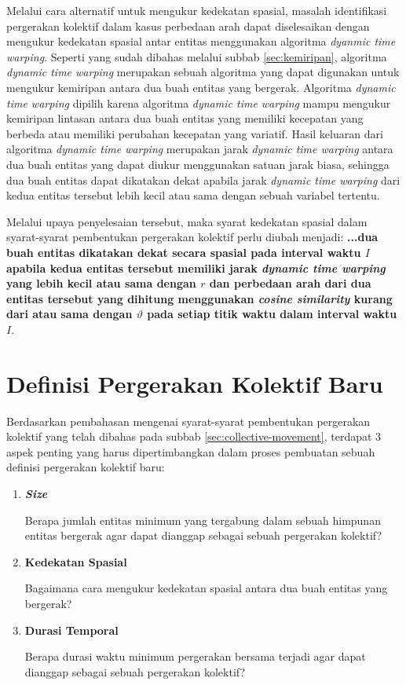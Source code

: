 Melalui cara alternatif untuk mengukur kedekatan spasial, masalah identifikasi pergerakan kolektif dalam kasus perbedaan arah dapat diselesaikan dengan mengukur kedekatan spasial antar entitas menggunakan algoritma \textit{dyanmic time warping}. Seperti yang sudah dibahas melalui subbab \ref{sec:kemiripan}, algoritma \textit{dynamic time warping} merupakan sebuah algoritma yang dapat digunakan untuk mengukur kemiripan antara dua buah entitas yang bergerak. Algoritma \textit{dynamic time warping} dipilih karena algoritma \textit{dynamic time warping} mampu mengukur kemiripan lintasan antara dua buah entitas yang memiliki kecepatan yang berbeda atau memiliki perubahan kecepatan yang variatif. Hasil keluaran dari algoritma \textit{dynamic time warping} merupakan jarak \textit{dynamic time warping} antara dua buah entitas yang dapat diukur menggunakan satuan jarak biasa, sehingga dua buah entitas dapat dikatakan dekat apabila jarak \textit{dynamic time warping} dari kedua entitas tersebut lebih kecil atau sama dengan sebuah variabel tertentu.

Melalui upaya penyelesaian tersebut, maka syarat kedekatan spasial dalam syarat-syarat pembentukan pergerakan kolektif perlu diubah menjadi: \textbf{...dua buah entitas dikatakan dekat secara spasial pada interval waktu $I$ apabila kedua entitas tersebut memiliki jarak \textit{dynamic time warping} yang lebih kecil atau sama dengan $r$ dan perbedaan arah dari dua entitas tersebut yang dihitung menggunakan \textit{cosine similarity} kurang dari atau sama dengan $\vartheta$ pada setiap titik waktu dalam interval waktu $I$}.

\section{Definisi Pergerakan Kolektif Baru}

Berdasarkan pembahasan mengenai syarat-syarat pembentukan pergerakan kolektif yang telah dibahas pada subbab \ref{sec:collective-movement}, terdapat 3 aspek penting yang harus dipertimbangkan dalam proses pembuatan sebuah definisi pergerakan kolektif baru:

\begin{enumerate}
    \item \textbf{\textit{Size}}
    
    Berapa jumlah entitas minimum yang tergabung dalam sebuah himpunan entitas bergerak agar dapat dianggap sebagai sebuah pergerakan kolektif?
    
    \item \textbf{Kedekatan Spasial}
    
    Bagaimana cara mengukur kedekatan spasial antara dua buah entitas yang bergerak?
    
    \item \textbf{Durasi Temporal}
    
    Berapa durasi waktu minimum pergerakan bersama terjadi agar dapat dianggap sebagai sebuah pergerakan kolektif?
\end{enumerate}

